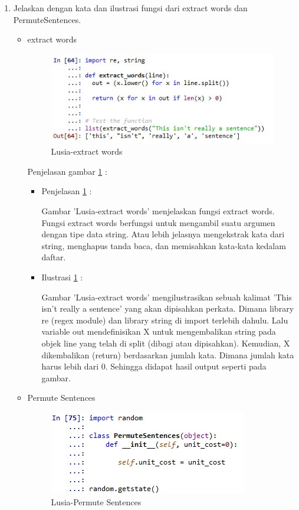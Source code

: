 \begin{enumerate}
\item Jelaskan dengan kata dan ilustrasi fungsi dari extract words dan PermuteSentences. 
	\begin{itemize}
		\item extract words 
			\begin{figure}[ht]
			\centering
			\includegraphics[scale=0.5]{figures/q2a.jpg}
			\caption{Lusia-extract words}
			\label{5b14}
			\end{figure}
			\par Penjelasan gambar \ref{5b14} : 
			\begin{itemize}
				\item Penjelasan \ref{5b14} : 
					\par Gambar 'Lusia-extract words' menjelaskan fungsi extract words. Fungsi extract words berfungsi untuk mengambil suatu argumen dengan tipe data string. Atau lebih jelasnya mengekstrak kata dari string, menghapus tanda baca, dan memisahkan kata-kata kedalam daftar.
				\item Ilustrasi \ref{5b14} : 
					\par Gambar 'Lusia-extract words' mengilustrasikan sebuah kalimat 'This isn't really a sentence' yang  akan dipisahkan perkata. Dimana library re (regex module) dan library string di import terlebih dahulu. Lalu variable out mendefinisikan X untuk mengembalikan string pada objek line yang telah di split (dibagi atau dipisahkan). Kemudian, X dikembalikan (return) berdasarkan jumlah kata. Dimana jumlah kata harus lebih dari 0. Sehingga didapat hasil output seperti pada gambar.
			\end{itemize}
			
			
		\item Permute Sentences
			\begin{figure}[ht]
			\centering
			\includegraphics[scale=0.5]{figures/q2b.jpg}
			\caption{Lusia-Permute Sentences}
			\label{5b15}
			\end{figure}
			

\end{itemize}
\end{enumerate}
